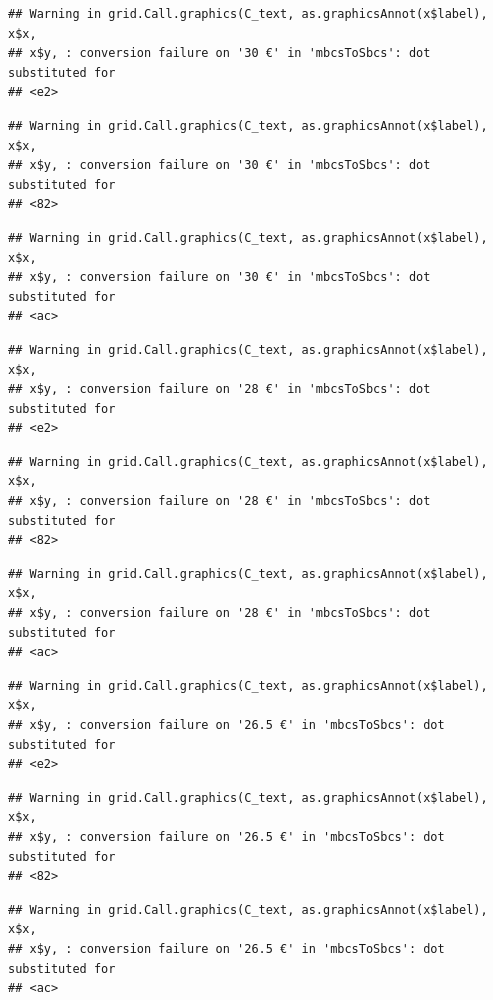 \documentclass[]{gitbook}
\theoremstyle{definition}
\theoremstyle{definition}
\theoremstyle{definition}
\theoremstyle{remark}
\begin{document}
\begin{verbatim}
## Warning in grid.Call.graphics(C_text, as.graphicsAnnot(x$label), x$x,
## x$y, : conversion failure on '30 €' in 'mbcsToSbcs': dot substituted for
## <e2>
\end{verbatim}

\begin{verbatim}
## Warning in grid.Call.graphics(C_text, as.graphicsAnnot(x$label), x$x,
## x$y, : conversion failure on '30 €' in 'mbcsToSbcs': dot substituted for
## <82>
\end{verbatim}

\begin{verbatim}
## Warning in grid.Call.graphics(C_text, as.graphicsAnnot(x$label), x$x,
## x$y, : conversion failure on '30 €' in 'mbcsToSbcs': dot substituted for
## <ac>
\end{verbatim}

\begin{verbatim}
## Warning in grid.Call.graphics(C_text, as.graphicsAnnot(x$label), x$x,
## x$y, : conversion failure on '28 €' in 'mbcsToSbcs': dot substituted for
## <e2>
\end{verbatim}

\begin{verbatim}
## Warning in grid.Call.graphics(C_text, as.graphicsAnnot(x$label), x$x,
## x$y, : conversion failure on '28 €' in 'mbcsToSbcs': dot substituted for
## <82>
\end{verbatim}

\begin{verbatim}
## Warning in grid.Call.graphics(C_text, as.graphicsAnnot(x$label), x$x,
## x$y, : conversion failure on '28 €' in 'mbcsToSbcs': dot substituted for
## <ac>
\end{verbatim}

\begin{verbatim}
## Warning in grid.Call.graphics(C_text, as.graphicsAnnot(x$label), x$x,
## x$y, : conversion failure on '26.5 €' in 'mbcsToSbcs': dot substituted for
## <e2>
\end{verbatim}

\begin{verbatim}
## Warning in grid.Call.graphics(C_text, as.graphicsAnnot(x$label), x$x,
## x$y, : conversion failure on '26.5 €' in 'mbcsToSbcs': dot substituted for
## <82>
\end{verbatim}

\begin{verbatim}
## Warning in grid.Call.graphics(C_text, as.graphicsAnnot(x$label), x$x,
## x$y, : conversion failure on '26.5 €' in 'mbcsToSbcs': dot substituted for
## <ac>
\end{verbatim}
\end{document}
